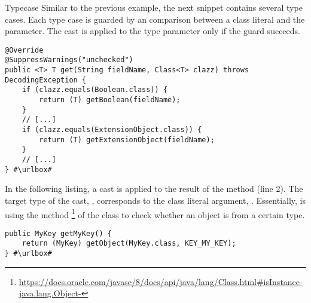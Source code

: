 \begin{pattern}{Typecase}
Similar to the previous example, the next snippet contains several type cases.
Each type case is guarded by an  comparison between a class literal and the  parameter.
The cast is applied to the type parameter  only if the guard succeeds.

\def\urlvar{http://bit.ly/OPCFoundation_UA_Java_Legacy_2Fb2xmZ}
\begin{verbatim}
@Override
@SuppressWarnings("unchecked")
public <T> T get(String fieldName, Class<T> clazz) throws DecodingException {
    if (clazz.equals(Boolean.class)) {
        return (T) getBoolean(fieldName);
    }
    // [...]
    if (clazz.equals(ExtensionObject.class)) {
        return (T) getExtensionObject(fieldName);
    }
    // [...]
} #\urlbox#
\end{verbatim}

In the following listing,
a cast is applied to the result of the  method (line 2).
The target type of the cast, , corresponds to the class literal argument, .
Essentially,  is using the  method%
\footnote{\url{https://docs.oracle.com/javase/8/docs/api/java/lang/Class.html\#isInstance-java.lang.Object-}}
of the class  to check whether an object is from a certain type.

\def\urlvar{http://bit.ly/smartdevicelink_sdl_android_2EjJiaq}
\begin{verbatim}
public MyKey getMyKey() {
    return (MyKey) getObject(MyKey.class, KEY_MY_KEY);
} #\urlbox#
\end{verbatim}


\end{pattern}
